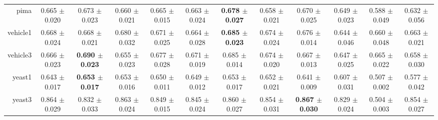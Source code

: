 \begin{table}[!ht]
{\begin{tabular}{r c c c c c c c c c c c}
pima & 0.665 $\pm$ 0.020 & 0.673 $\pm$ 0.023 & 0.660 $\pm$ 0.021 & 0.665 $\pm$ 0.015 & 0.663 $\pm$ 0.024 & \textbf{0.678 $\pm$ 0.027} & 0.658 $\pm$ 0.021 & 0.670 $\pm$ 0.025 & 0.649 $\pm$ 0.023 & 0.588 $\pm$ 0.049 & 0.632 $\pm$ 0.056 \\
vehicle1 & 0.668 $\pm$ 0.024 & 0.668 $\pm$ 0.021 & 0.680 $\pm$ 0.032 & 0.671 $\pm$ 0.025 & 0.664 $\pm$ 0.028 & \textbf{0.685 $\pm$ 0.023} & 0.674 $\pm$ 0.024 & 0.676 $\pm$ 0.014 & 0.644 $\pm$ 0.046 & 0.660 $\pm$ 0.048 & 0.663 $\pm$ 0.021 \\
vehicle3 & 0.666 $\pm$ 0.023 & \textbf{0.690 $\pm$ 0.023} & 0.655 $\pm$ 0.023 & 0.677 $\pm$ 0.028 & 0.671 $\pm$ 0.019 & 0.685 $\pm$ 0.014 & 0.674 $\pm$ 0.020 & 0.667 $\pm$ 0.013 & 0.647 $\pm$ 0.025 & 0.665 $\pm$ 0.022 & 0.658 $\pm$ 0.030 \\
yeast1 & 0.643 $\pm$ 0.017 & \textbf{0.653 $\pm$ 0.017} & 0.653 $\pm$ 0.016 & 0.650 $\pm$ 0.011 & 0.649 $\pm$ 0.012 & 0.653 $\pm$ 0.017 & 0.652 $\pm$ 0.021 & 0.641 $\pm$ 0.009 & 0.607 $\pm$ 0.031 & 0.507 $\pm$ 0.002 & 0.577 $\pm$ 0.042 \\
yeast3 & 0.864 $\pm$ 0.029 & 0.832 $\pm$ 0.033 & 0.863 $\pm$ 0.024 & 0.849 $\pm$ 0.015 & 0.845 $\pm$ 0.024 & 0.860 $\pm$ 0.027 & 0.854 $\pm$ 0.031 & \textbf{0.867 $\pm$ 0.030} & 0.829 $\pm$ 0.024 & 0.504 $\pm$ 0.003 & 0.854 $\pm$ 0.027 \\
\end{tabular}}
\end{table}

